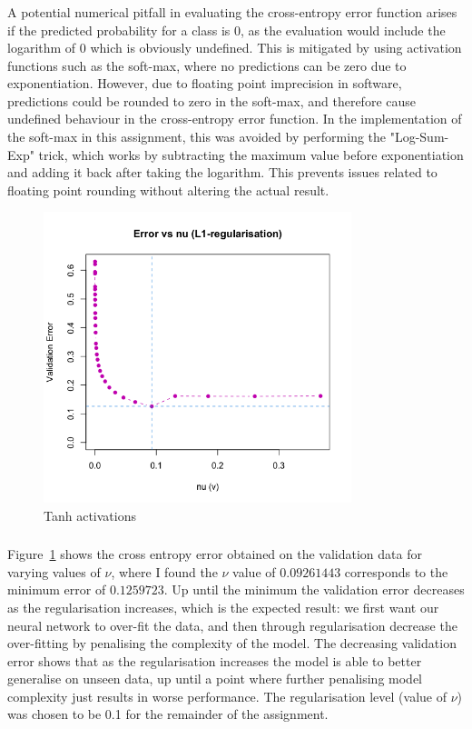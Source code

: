 \documentclass[12pt]{article}
\begin{document}
\newpage
\subsubsection{}
A potential numerical pitfall in evaluating the cross-entropy error function arises if the predicted probability for a class is 0, as the evaluation would include the logarithm of 0 which is obviously undefined. This is mitigated by using activation functions such as the soft-max, where no predictions can be zero due to exponentiation. However, due to floating point imprecision in software, predictions could be rounded to zero in the soft-max, and therefore cause undefined behaviour in the cross-entropy error function. In the implementation of the soft-max in this assignment, this was avoided by performing the "Log-Sum-Exp" trick, which works by subtracting the maximum value before exponentiation and adding it back after taking the logarithm. This prevents issues related to floating point rounding without altering the actual result.

\begin{figure}[h]
\centering
\includegraphics[width=0.8\textwidth]{question_c_plot.png}
\caption{Tanh activations}
\label{fig:fig1}
\end{figure}

\newpage
\subsubsection{}
Figure~\ref{fig:fig1} shows the cross entropy error obtained on the validation data for varying values of \( \nu \), where I found the \( \nu \) value of \( 0.09261443 \) corresponds to the minimum error of \( 0.1259723 \). Up until the minimum the validation error decreases as the regularisation increases, which is the expected result: we first want our neural network to over-fit the data, and then through regularisation decrease the over-fitting by penalising the complexity of the model. The decreasing validation error shows that as the regularisation increases the model is able to better generalise on unseen data, up until a point where further penalising model complexity just results in worse performance. The regularisation level (value of \( \nu \)) was chosen to be 0.1 for the remainder of the assignment. 
\end{document}
